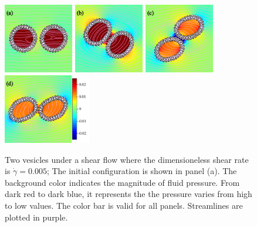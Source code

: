 \documentclass[lineno]{jfm}
\begin{document}
\begin{figure}
\centering
\includegraphics[height=1.2in]{N116_shear_0.pdf}
\includegraphics[height=1.2in]{N116_shear_3000.pdf}
\includegraphics[height=1.2in]{N116_shear_6000.pdf}
\includegraphics[height=1.2in]{N116_shear_9000.pdf}\\
  \caption{Two vesicles under a shear flow where the dimensioneless shear rate is $\dot\gamma=0.005$; The initial configuration is shown in panel (a). The background color indicates the magnitude of fluid pressure. From dark red to dark blue, it represents the the pressure varies from high to low values. The color bar is valid for all panels. Streamlines are plotted in purple.
  }
    \label{figure9}
\end{figure}



\end{document}
